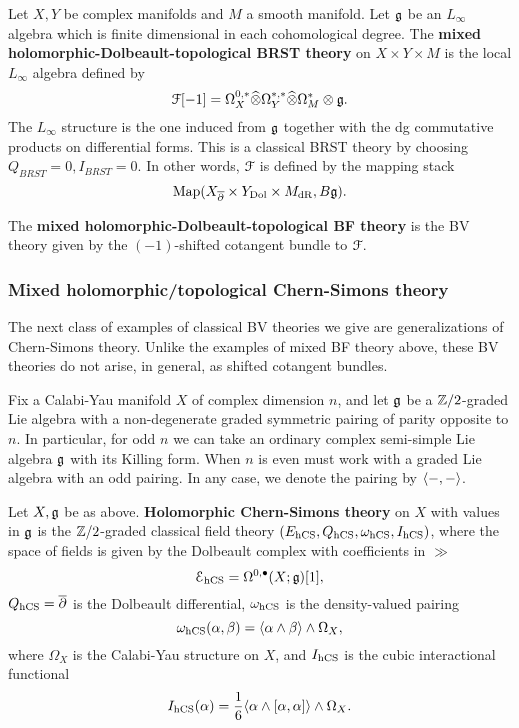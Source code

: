 \documentclass[10pt, oneside]{article}
\begin{document}
\begin{dfn}
Let $X,Y$ be complex manifolds and $M$ a smooth manifold.
Let $\mathfrak g$ be an $L_\infty$ algebra which is finite dimensional in each cohomological degree. 
The {\bf mixed holomorphic-Dolbeault-topological BRST theory}  on $X \times Y \times M$ is the local $L_\infty$ algebra defined by
\[
\mathcal F[-1] = \Omega^{0,*}_X \widehat{\otimes} \Omega^{*,*}_Y \widehat{\otimes} \Omega^*_M \otimes \mathfrak g .
\] 
The $L_\infty$ structure is the one induced from $\mathfrak g$ together with the dg commutative products on differential forms. 
This is a classical BRST theory by choosing $Q_{BRST} = 0, I_{BRST} = 0$. 
In other words, $\mathcal F$ is defined by the mapping stack
\[
{\rm Map} (X_{\overline{\partial}} \times Y_{\rm Dol} \times M_{\rm dR}, B \mathfrak g) .
\]

The {\bf mixed holomorphic-Dolbeault-topological BF theory} is the BV theory given by the $(-1)$-shifted cotangent bundle to $\mathcal F$.

\end{dfn}

\subsubsection{Mixed holomorphic/topological Chern-Simons theory}

The next class of examples of classical BV theories we give are generalizations of Chern-Simons theory. 
Unlike the examples of mixed BF theory above, these BV theories do not arise, in general, as shifted cotangent bundles. 

Fix a Calabi-Yau manifold $X$ of complex dimension $n$, and let $\mathfrak g$ be a $\mathbb Z/2$-graded Lie algebra with a non-degenerate graded symmetric pairing of parity opposite to $n$. 
In particular, for odd $n$ we can take an ordinary complex semi-simple Lie algebra $\mathfrak g$ with its Killing form. 
When $n$ is even must work with a graded Lie algebra with an odd pairing.
In any case, we denote the pairing by $\langle-,-\rangle$. 

\begin{dfn}
Let $X, \mathfrak g$ be as above.
{\bf Holomorphic Chern-Simons theory} on $X$ with values in $\mathfrak g$ is the $\mathbb Z/2$-graded classical field theory $(E_{\mathrm{hCS}}, Q_{\mathrm{hCS}}, \omega_{\mathrm{hCS}}, I_{\mathrm{hCS}})$, where the space of fields is given by the Dolbeault complex with coefficients in $\gg$
\[
\mathcal E_{\mathrm{hCS}} = \Omega^{0,\bullet}(X;\mathfrak{g})[1],
\]
$Q_{\mathrm{hCS}} = \overline{\partial}$ is the Dolbeault differential, $\omega_{\mathrm{hCS}}$ is the density-valued pairing
\[
\omega_{\mathrm{hCS}} (\alpha,\beta) = \langle\alpha \wedge \beta\rangle \wedge \Omega_X,
\]
where $\Omega_X$ is the Calabi-Yau structure on $X$, and $I_{\mathrm{hCS}}$ is the cubic interactional functional
\[
I_{\mathrm{hCS}}(\alpha) = \frac 16 \langle\alpha \wedge [\alpha, \alpha]\rangle \wedge \Omega_X .
\]
\end{dfn}
\end{document}
